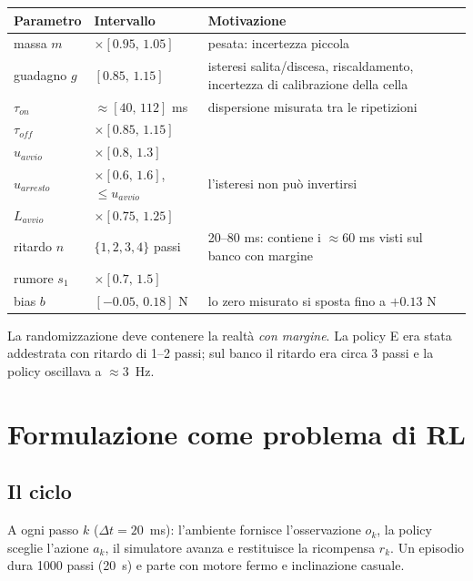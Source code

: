 \documentclass[11pt,a4paper]{article}
\newcommand{\envfile}{../../controller/env_fan.py}
\newcommand{\envlines}[2]{}
\begin{document}
\begin{center}
\begin{tabularx}{\textwidth}{@{}llX@{}}
\toprule
Parametro & Intervallo & Motivazione\\
\midrule
massa $m$ & $\times[0.95,\,1.05]$ & pesata: incertezza piccola\\
guadagno $g$ & $[0.85,\,1.15]$ & isteresi salita/discesa, riscaldamento, incertezza di calibrazione della cella\\
$\tau_{on}$ & $\approx[40,\,112]$ ms & dispersione misurata tra le ripetizioni\\
$\tau_{off}$ & $\times[0.85,\,1.15]$ & \\
$u_{avvio}$ & $\times[0.8,\,1.3]$ & \\
$u_{arresto}$ & $\times[0.6,\,1.6]$, $\le u_{avvio}$ & l'isteresi non può invertirsi\\
$L_{avvio}$ & $\times[0.75,\,1.25]$ & \\
ritardo $n$ & $\{1,2,3,4\}$ passi & 20--80 ms: contiene i $\approx$60 ms visti sul banco con margine\\
rumore $s_1$ & $\times[0.7,\,1.5]$ & \\
bias $b$ & $[-0.05,\,0.18]$ N & lo zero misurato si sposta fino a $+0.13$ N\\
\bottomrule
\end{tabularx}
\end{center}
\envlines{127}{157}

\begin{attenzione}
La randomizzazione deve contenere la realtà \emph{con margine}. La policy E era stata addestrata con
ritardo di 1--2 passi; sul banco il ritardo era circa 3 passi e la policy oscillava a $\approx3$~Hz.
\end{attenzione}

\section{Formulazione come problema di RL}

\subsection{Il ciclo}
A ogni passo $k$ ($\Delta t = 20$~ms): l'ambiente fornisce l'osservazione $o_k$, la policy sceglie
l'azione $a_k$, il simulatore avanza e restituisce la ricompensa $r_k$. Un episodio dura
1000 passi (20~s) e parte con motore fermo e inclinazione casuale.
\envlines{268}{313}
\end{document}
